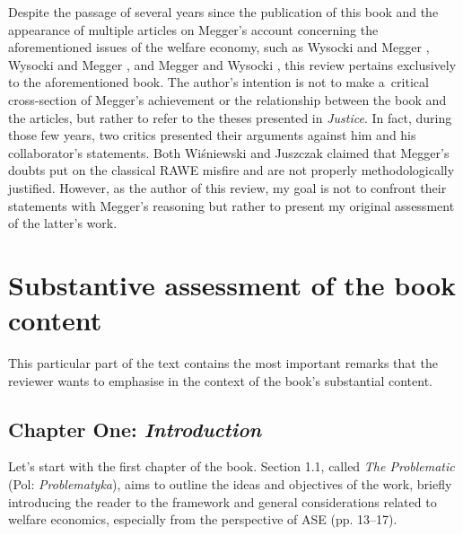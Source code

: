 Despite the passage of several years since the publication of this book and the appearance of multiple articles on Megger's account concerning the aforementioned issues of the welfare economy, such as Wysocki and Megger 
\parencite*[][]{wysocki_austrian_2019}, %
 Wysocki and Megger 
\parencite*[][]{wysocki_rejoinder_2020}, %
 and Megger and Wysocki 
\parencite*[][]{megger_austriacka_2023}, %
 this review pertains exclusively to the aforementioned book. The author's intention is not to make a~critical cross-section of Megger's achievement or the relationship between the book and the articles, but rather to refer to the theses presented in \textit{Justice}. In fact, during those few years, two critics presented their arguments against him and his collaborator's statements. Both Wiśniewski 
\parencite*[][]{wisniewski_austrian_2019} %
 and Juszczak 
\parencite*[][]{} %
 claimed that Megger's doubts put on the classical RAWE misfire and are not properly methodologically justified. However, as the author of this review, my goal is not to confront their statements with Megger's reasoning but rather to present my original assessment of the latter's work.



\section{Substantive assessment of the book content}

This particular part of the text contains the most important remarks that the reviewer wants to emphasise in the context of the book's substantial content.



\subsection{Chapter One: \textit{Introduction}}



Let's start with the first chapter of the book. Section 1.1, called \textit{The Problematic} (Pol: \textit{Problematyka}), aims to outline the ideas and objectives of the work, briefly introducing the reader to the framework and general considerations related to welfare economics, especially from the perspective of ASE (pp. 13–17).




